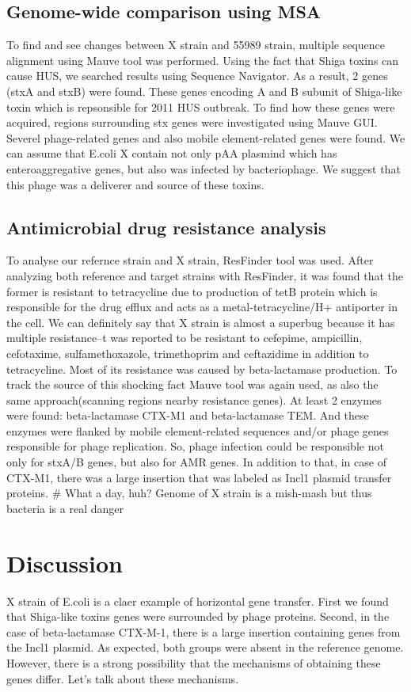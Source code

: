 \documentclass{article}
\begin{document}
\subsection{ Genome-wide comparison using MSA} 
To find and see changes between X strain and 55989 strain, multiple sequence alignment using Mauve tool was performed. Using the fact that Shiga toxins can cause HUS, we searched results using Sequence Navigator. As a result, 2 genes (stxA and stxB) were found. These genes encoding A and B subunit of Shiga-like toxin which is repsonsible for 2011 HUS outbreak. To find how these genes were acquired, regions surrounding stx genes were investigated using Mauve GUI. Severel phage-related genes and also mobile element-related genes were found. We can assume that E.coli X contain not only pAA plasmind which has enteroaggregative genes, but also was infected by bacteriophage. We suggest that this phage was a deliverer and source of these toxins.
\subsection{Antimicrobial drug resistance analysis}
To analyse our refernce strain and X strain, ResFinder tool was used.
After analyzing both reference and target strains with ResFinder, it was found that the former is resistant to tetracycline due to production of tetB protein which is responsible for the drug efflux and acts as a metal-tetracycline/H+ antiporter in the cell. We can definitely say that X strain is almost a superbug because it has multiple resistance--t was reported to be resistant to cefepime, ampicillin, cefotaxime, sulfamethoxazole, trimethoprim and ceftazidime in addition to tetracycline. Most of its resistance was caused by beta-lactamase production. To track the source of this shocking fact Mauve tool was again used, as also the same approach(scanning regions nearby resistance genes). At least 2 enzymes were found: beta-lactamase CTX-M1 and beta-lactamase TEM. And these enzymes were flanked by mobile element-related sequences and/or phage genes responsible for phage replication. So, phage infection could be responsible not only for stxA/B genes, but also for AMR genes. In addition to that, in case of CTX-M1, there was a large insertion that was labeled as Incl1 plasmid transfer proteins. \# What a day, huh? Genome of X strain is a mish-mash but thus bacteria is a real danger

  
\section{Discussion}
X strain of E.coli is a claer example of horizontal gene transfer. First we found that Shiga-like toxins genes were surrounded by phage proteins. Second, in the case of beta-lactamase CTX-M-1, there is a large insertion containing genes from the Incl1 plasmid. As expected, both groups were absent in the reference genome. However, there is a strong possibility that the mechanisms of obtaining these genes differ. Let's talk about these mechanisms.
\end{document}

